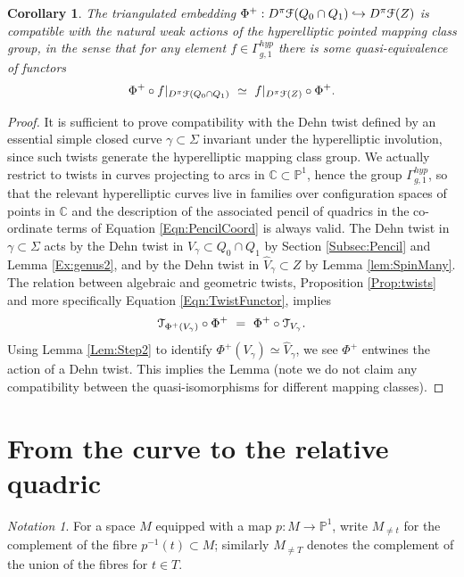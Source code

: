 \documentclass[reqno,10pt]{amsart}
\numberwithin{equation}{section}
\newcommand{\bC}{{\mathbb C}}
\newcommand{\bP}{{\mathbb P}}
\newcommand{\scrT}{\EuScript{T}}
\newcommand{\scrF}{\EuScript{F}}
\newtheorem{Corollary}[thm]{Corollary}
\theoremstyle{remark}
\newtheorem*{Notation}{Notation}
\begin{document}
\begin{Corollary} \label{Cor:MappingClassCompatible-1}
The triangulated embedding $\Phi^+: D^{\pi}\scrF(Q_0 \cap Q_1) \hookrightarrow D^{\pi}\scrF(Z)$ is compatible with the natural weak actions of the hyperelliptic pointed mapping class group, in the sense that  for any element $f \in \Gamma_{g,1}^{hyp}$ there is some quasi-equivalence of functors
\[
\Phi^+ \circ f|_{D^{\pi}\scrF(Q_0 \cap Q_1)} \ \simeq \ f|_{D^{\pi} \scrF(Z)} \circ \Phi^+.
\]
\end{Corollary}

\begin{proof}
It is sufficient to prove compatibility with the Dehn twist defined by an essential simple closed curve $\gamma \subset \Sigma$ invariant under the hyperelliptic involution, since such twists generate the hyperelliptic mapping class group.   We actually restrict to twists in curves projecting to arcs in $\bC \subset \bP^1$, hence the group $\Gamma_{g,1}^{hyp}$, so that the relevant hyperelliptic curves live in families over configuration spaces of points in $\bC$ and the description of the associated pencil of quadrics in the co-ordinate terms of Equation \ref{Eqn:PencilCoord} is always valid.  The Dehn twist in $\gamma \subset \Sigma$  acts by the Dehn twist in $V_{\gamma} \subset Q_0 \cap Q_1$ by Section \ref{Subsec:Pencil} and Lemma \ref{Ex:genus2}, and by the Dehn twist in $\hat{V}_{\gamma} \subset Z$ by Lemma \ref{lem:SpinMany}.  The relation between algebraic and geometric twists, Proposition \ref{Prop:twists} and more specifically Equation \ref{Eqn:TwistFunctor}, implies
\[
\scrT_{\Phi^+(V_{\gamma})} \circ \Phi^+ \ = \ \Phi^+ \circ \scrT_{V_{\gamma}}.
\]
Using Lemma \ref{Lem:Step2} to identify $\Phi^+(V_{\gamma}) \simeq \hat{V}_{\gamma}$, we see $\Phi^+$ entwines the action of a Dehn twist. This implies the Lemma (note we do not claim any compatibility between the quasi-isomorphisms for different mapping classes).
\end{proof}



\section{From the curve to the relative quadric\label{Sec:CurveToQuadric}}

\begin{Notation} For a space $M$ equipped with a map $p:M \rightarrow \bP^1$, write $M_{\neq t}$ for the complement of the fibre $p^{-1}(t) \subset M$; similarly $M_{\neq T}$ denotes the complement of the union of the fibres for $t\in T$.
\end{Notation}
\end{document}
